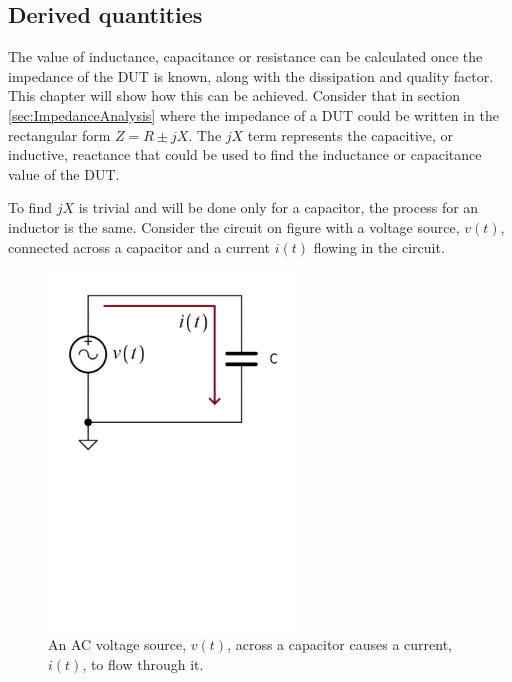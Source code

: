 \subsection{Derived quantities} \label{subsec:DerivedQuantities}
The value of inductance, capacitance or resistance can be calculated once the impedance of the DUT is known, along with the dissipation and quality factor. This chapter will show how this can be achieved. Consider that in section \ref{sec:ImpedanceAnalysis} where the impedance of a DUT could be written in the rectangular form $Z = R \pm jX$. The $jX$ term represents the capacitive, or inductive, reactance that could be used to find the inductance or capacitance value of the DUT.

To find $jX$ is trivial and will be done only for a capacitor, the process for an inductor is the same. Consider the circuit on figure  with a voltage source, $v(t)$, connected across a capacitor and a current $i(t)$ flowing in the circuit. 
\begin{figure}[H]
    \centering
    \includegraphics[clip, trim=0 400 0 0, width=0.60\textwidth]{Sections/4_TechnicalAnalysis/Figures/4_1_1_CapCircuit.pdf}
    \caption{An AC voltage source, $v(t)$, across a capacitor causes a current, $i(t)$, to flow through it.}
    \label{fig:4_1_1_CapCircuit}
\end{figure}

